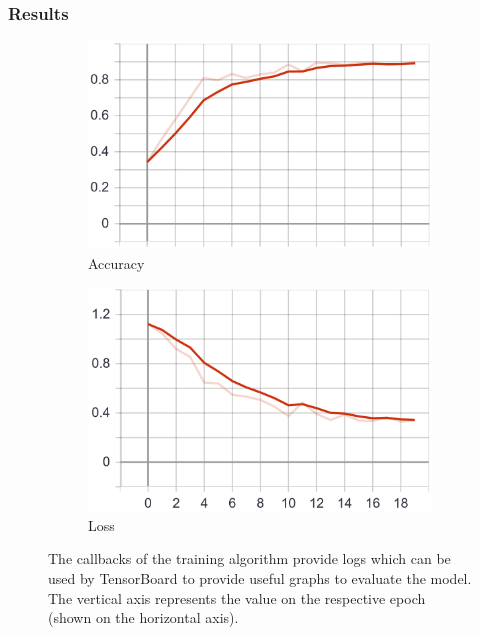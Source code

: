 \subsubsection{Results}
\begin{figure} \label{fig:learning_rate}
    \centering
    \begin{subfigure}[b]{0.4\textwidth}
        \includegraphics[width=\textwidth]{images/first_model_acc.png}
        \caption{Accuracy}
        \label{fig:first_model_acc}
    \end{subfigure}
    \begin{subfigure}[b]{0.4\textwidth}
        \includegraphics[width=\textwidth]{images/first_model_loss.png}
        \caption{Loss}
        \label{fig:first_model_loss}
    \end{subfigure}
    \caption{The callbacks of the training algorithm provide logs which can be used by TensorBoard to provide useful graphs to evaluate the model. The vertical axis represents the value on the respective epoch (shown on the horizontal axis).}
\end{figure}

